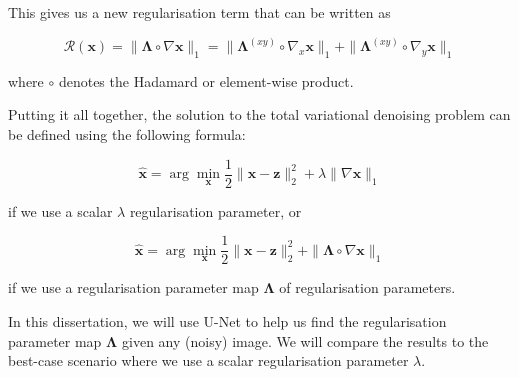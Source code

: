 \documentclass[12pt]{article}
\begin{document}
This gives us a new regularisation term that can be written as




\begin{equation}
  \mathcal{R}(\mathbf{x}) = \| \mathbf{\Lambda} \circ \nabla \mathbf{x} \|_1
  = \| \mathbf{\Lambda}^{(xy)} \circ \nabla_x \mathbf{x} \|_1 + \| \mathbf{\Lambda}^{(xy)} \circ \nabla_y \mathbf{x} \|_1
\end{equation}

where $\circ$ denotes the Hadamard or element-wise product.



Putting it all together, 
the solution to the total variational denoising problem
can be 
defined
using the following formula:

\begin{equation}
  \hat{\mathbf{x}} = \arg \min_{\mathbf{x}} \frac{1}{2} \|\mathbf{x} - \mathbf{z}\|_2^2 + \lambda \| \nabla \mathbf{x} \|_1
\end{equation}

if we use a scalar $\lambda$ regularisation parameter, or

\begin{equation} \label{eq:1}
  \hat{\mathbf{x}} = \arg \min_{\mathbf{x}} \frac{1}{2} \|\mathbf{x} - \mathbf{z}\|_2^2 + \| \mathbf{\Lambda} \circ \nabla \mathbf{x} \|_1
\end{equation}

if we use a regularisation parameter map $\mathbf{\Lambda}$ of regularisation parameters.

In this dissertation, we will use
U-Net to help us find the regularisation parameter map $\mathbf{\Lambda}$ 
given any (noisy) image. 
We will compare the results to the best-case scenario where we use a scalar regularisation parameter $\lambda$.

\end{document}
